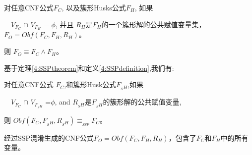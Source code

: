 %
%
%

\begin{theorem}\label{4:SSPtheorem}

对任意CNF公式$F_C$, 以及簇形Husks公式$F_H$, 如果

~~$V_{F_C}$ $\cap$ $V_{F_H}$ = $\phi$, 并且
$R_H$是$F_H$的一个簇形解的公共赋值变量集，
$F_O=Obf(F_C,F_H,R_H)$。

则 $F_O \equiv F_C \wedge F_H  $。
\end{theorem}

基于定理\ref{4:SSPtheorem}和定义\ref{4:SSPdefinition},我们有:
\begin{theorem}\label{4:SSPinference}
对任意CNF公式 $F_C$,和簇形Husk公式$F_{_SH}$,如果

~~$V_{F_C}$ $\cap$ $V_{F_{_SH}}$ =$\phi$, and
$R_{_SH}$是$F_{_SH}$的簇形解的公共赋值变量,

则 $Obf(F_C,F_{_SH},R_{_SH}) \equiv_{_{SSP}} F_C$。
\end{theorem}



经过SSP混淆生成的CNF公式$F_O=Obf(F_C,F_H,R_H)$，包含了$F_C$和$F_H$中的所有变量。

